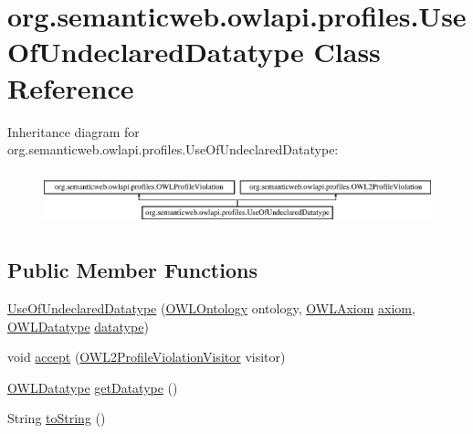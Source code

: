 \hypertarget{classorg_1_1semanticweb_1_1owlapi_1_1profiles_1_1_use_of_undeclared_datatype}{\section{org.\-semanticweb.\-owlapi.\-profiles.\-Use\-Of\-Undeclared\-Datatype Class Reference}
\label{classorg_1_1semanticweb_1_1owlapi_1_1profiles_1_1_use_of_undeclared_datatype}
}
Inheritance diagram for org.\-semanticweb.\-owlapi.\-profiles.\-Use\-Of\-Undeclared\-Datatype\-:\begin{figure}[H]
\begin{center}
\leavevmode
\includegraphics[height=1.577465cm]{classorg_1_1semanticweb_1_1owlapi_1_1profiles_1_1_use_of_undeclared_datatype}
\end{center}
\end{figure}
\subsection*{Public Member Functions}
\begin{DoxyCompactItemize}
\item 
\hyperlink{classorg_1_1semanticweb_1_1owlapi_1_1profiles_1_1_use_of_undeclared_datatype_ab5b2f94cbee019ea5693b4645020f2cc}{Use\-Of\-Undeclared\-Datatype} (\hyperlink{interfaceorg_1_1semanticweb_1_1owlapi_1_1model_1_1_o_w_l_ontology}{O\-W\-L\-Ontology} ontology, \hyperlink{interfaceorg_1_1semanticweb_1_1owlapi_1_1model_1_1_o_w_l_axiom}{O\-W\-L\-Axiom} \hyperlink{classorg_1_1semanticweb_1_1owlapi_1_1profiles_1_1_o_w_l_profile_violation_aa7c8e8910ed3966f64a2c003fb516214}{axiom}, \hyperlink{interfaceorg_1_1semanticweb_1_1owlapi_1_1model_1_1_o_w_l_datatype}{O\-W\-L\-Datatype} \hyperlink{classorg_1_1semanticweb_1_1owlapi_1_1profiles_1_1_use_of_undeclared_datatype_a5ee736da309c9b82ffba64dd4f8363ea}{datatype})
\item 
void \hyperlink{classorg_1_1semanticweb_1_1owlapi_1_1profiles_1_1_use_of_undeclared_datatype_a777dab1096875c243192e14e62eeb1b9}{accept} (\hyperlink{interfaceorg_1_1semanticweb_1_1owlapi_1_1profiles_1_1_o_w_l2_profile_violation_visitor}{O\-W\-L2\-Profile\-Violation\-Visitor} visitor)
\item 
\hyperlink{interfaceorg_1_1semanticweb_1_1owlapi_1_1model_1_1_o_w_l_datatype}{O\-W\-L\-Datatype} \hyperlink{classorg_1_1semanticweb_1_1owlapi_1_1profiles_1_1_use_of_undeclared_datatype_aa6c39d0d046010f17c59f39cce88b6f6}{get\-Datatype} ()
\item 
String \hyperlink{classorg_1_1semanticweb_1_1owlapi_1_1profiles_1_1_use_of_undeclared_datatype_a5c3ef0558ad275b8e81ff710902d6f0c}{to\-String} ()
\end{DoxyCompactItemize}
